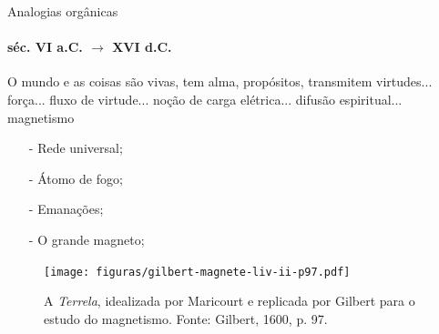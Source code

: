 \documentclass[aspectratio=169]{beamer}
\begin{document}
\begin{frame}{Analogias orgânicas}
\framesubtitle{séc. VI a.C. $\to$ XVI d.C.}
\begin{minipage}{0.57\textwidth}
O mundo e as coisas são vivas, tem alma, propósitos, transmitem virtudes... força... fluxo de virtude... noção de carga elétrica... difusão espiritual... magnetismo  
	\begin{itemize}
		\item[-] Rede universal; %
		\item[-] Átomo de fogo;%
		\item[-] Emanações;%
		\item[-] O grande magneto;%
	\end{itemize}
\end{minipage}
\begin{minipage}{0.4\textwidth}
	\begin{figure}
		\centering
		\texttt{[image: figuras/gilbert-magnete-liv-ii-p97.pdf]}
		\caption{A \emph{Terrela}, idealizada por Maricourt e replicada por Gilbert para o estudo do magnetismo. Fonte: Gilbert, 1600, p. 97.}
\label{fig:201}
	\end{figure}
\end{minipage}
\end{frame}
\end{document}

